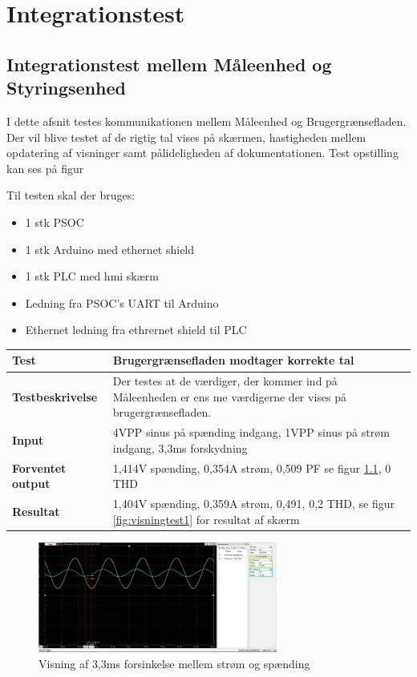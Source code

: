 
\chapter{Integrationstest}

\section{Integrationstest mellem Måleenhed og Styringsenhed}

I dette afsnit testes kommunikationen mellem Måleenhed og Brugergrænsefladen. Der vil blive testet af de rigtig tal vises på skærmen, hastigheden mellem opdatering af visninger samt pålideligheden af dokumentationen. Test opstilling kan ses på figur

Til testen skal der bruges:
\begin{itemize}
	\item 1 stk PSOC
	\item 1 stk Arduino med ethernet shield
	\item 1 stk PLC med hmi skærm
	\item Ledning fra PSOC's UART til Arduino
	\item Ethernet ledning fra ethrernet shield til PLC
\end{itemize}

\begin{center}
	\begin{tabular}{ | m{} | m{}|} 
		\hline
		\textbf{Test}					&Brugergrænsefladen modtager korrekte tal \\ \hline
		\textbf{Testbeskrivelse}		&Der testes at de værdiger, der kommer ind på Måleenheden er ens me værdigerne der vises på brugergrænsefladen. \\ \hline
		\textbf{Input}					&4VPP sinus på spænding indgang, 1VPP sinus på strøm indgang, 3,3ms forskydning \\ \hline
		\textbf{Forventet output}		&1,414V spænding, 0,354A strøm, 0,509 PF se figur \ref{fig:PFtest1}, 0 THD \\ \hline
		\textbf{Resultat}				&1,404V spænding, 0,359A strøm, 0,491, 0,2 THD,  se figur \ref*{fig:visningtest1} for resultat af skærm  \\ \hline
	\end{tabular}
\end{center}

\begin{figure}[H] %
	\centering
	\includegraphics[width=0.7\textwidth]{Test/PFTest1}
	\caption{Visning af 3,3ms forsinkelse mellem strøm og spænding}
	\label{fig:PFtest1}
\end{figure}

